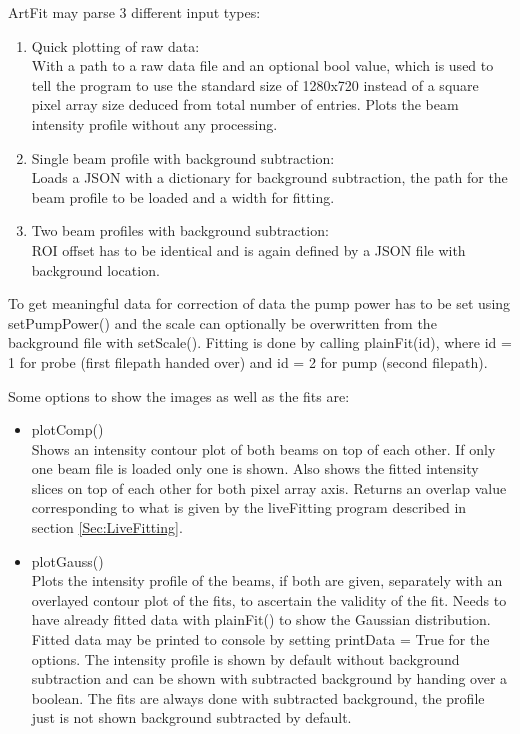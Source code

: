 \documentclass[twoside,openright]{scrreprt}
\begin{document}
{ArtFit may parse 3 different input types:
\begin{enumerate}
\item Quick plotting of raw data:\\
With a path to a raw data file and an optional bool value, which is used to tell the program to use the standard size of 1280x720 instead of a square pixel array size deduced from total number of entries. Plots the beam intensity profile without any processing.
\item Single beam profile with background subtraction: \\
Loads a JSON with a dictionary for background subtraction, the path for the beam profile to be loaded and a width for fitting.
\item Two beam profiles with background subtraction: \\
ROI offset has to be identical and is again defined by a JSON file with background location.
\end{enumerate}

To get meaningful data for correction of data the pump power has to be set using setPumpPower() and the scale can optionally be overwritten from the background file with setScale(). Fitting is done by calling plainFit(id), where id = 1 for probe (first filepath handed over) and id = 2 for pump (second filepath).

Some options to show the images as well as the fits are:
\begin{itemize}
\item plotComp()\\
Shows an intensity contour plot of both beams on top of each other. If only one beam file is loaded only one is shown. Also shows the fitted intensity slices on top of each other for both pixel array axis. Returns an overlap value corresponding to what is given by the liveFitting program described in section \ref{Sec:LiveFitting}.
\item plotGauss()\\
Plots the intensity profile of the beams, if both are given, separately with an overlayed contour plot of the fits, to ascertain the validity of the fit. Needs to have already fitted data with plainFit() to show the Gaussian distribution. Fitted data may be printed to console by setting printData = True for the options. The intensity profile is shown by default without background subtraction and can be shown with subtracted background by handing over a boolean. The fits are always done with subtracted background, the profile just is not shown background subtracted by default.
\end{itemize}


}
\end{document}
